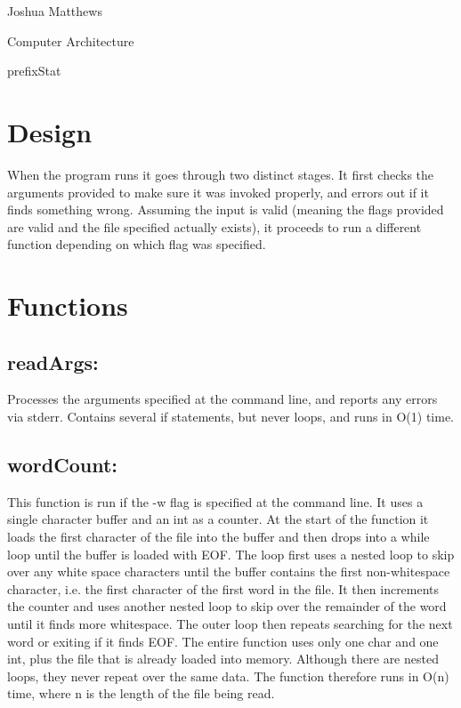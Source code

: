 \documentclass[letterpaper,12pt]{article}
\begin{document}
Joshua Matthews

Computer Architecture

prefixStat

\section{Design}
When the program runs it goes through two distinct stages. It first checks the arguments provided to make sure it was invoked properly, and errors out if it finds something wrong. Assuming the input is valid (meaning the flags provided are valid and the file specified actually exists), it proceeds to run a different function depending on which flag was specified.

\section{Functions}
\subsection{readArgs:}
Processes the arguments specified at the command line, and reports any errors via stderr. Contains several if statements, but never loops, and runs in O(1) time.

\subsection{wordCount:}
This function is run if the -w flag is specified at the command line. It uses a single character buffer and an int as a counter. At the start of the function it loads the first character of the file into the buffer and then drops into a while loop until the buffer is loaded with EOF. The loop first uses a nested loop to skip over any white space characters until the buffer contains the first non-whitespace character, i.e. the first character of the first word in the file. It then increments the counter and uses another nested loop to skip over the remainder of the word until it finds more whitespace. The outer loop then repeats searching for the next word or exiting if it finds EOF. The entire function uses only one char and one int, plus the file that is already loaded into memory. Although there are nested loops, they never repeat over the same data. The function therefore runs in O(n) time, where n is the length of the file being read.
\end{document}
